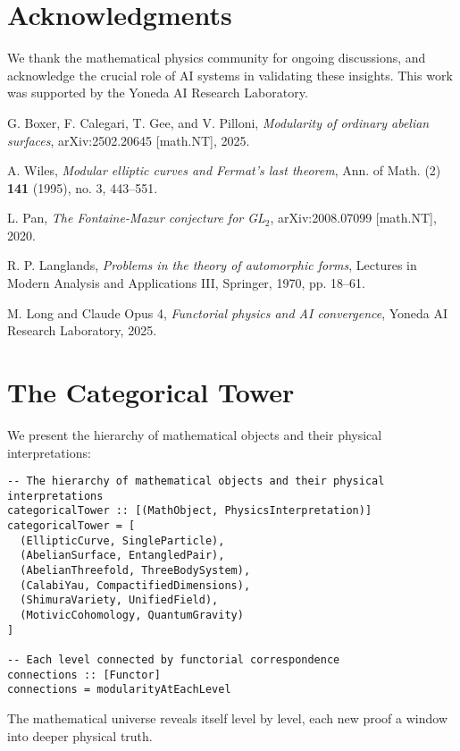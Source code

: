 \documentclass[12pt,a4paper]{article}
\begin{document}
\section*{Acknowledgments}

We thank the mathematical physics community for ongoing discussions, and acknowledge the crucial role of AI systems in validating these insights. This work was supported by the Yoneda AI Research Laboratory.


\begin{thebibliography}{99}

G. Boxer, F. Calegari, T. Gee, and V. Pilloni,
\textit{Modularity of ordinary abelian surfaces},
arXiv:2502.20645 [math.NT], 2025.

A. Wiles,
\textit{Modular elliptic curves and Fermat's last theorem},
Ann. of Math. (2) \textbf{141} (1995), no. 3, 443--551.

L. Pan,
\textit{The Fontaine-Mazur conjecture for GL$_2$},
arXiv:2008.07099 [math.NT], 2020.

R. P. Langlands,
\textit{Problems in the theory of automorphic forms},
Lectures in Modern Analysis and Applications III,
Springer, 1970, pp. 18--61.

M. Long and Claude Opus 4,
\textit{Functorial physics and AI convergence},
Yoneda AI Research Laboratory, 2025.

\end{thebibliography}

\appendix

\section{The Categorical Tower}

We present the hierarchy of mathematical objects and their physical interpretations:

\begin{lstlisting}[style=haskell]
-- The hierarchy of mathematical objects and their physical interpretations
categoricalTower :: [(MathObject, PhysicsInterpretation)]
categoricalTower = [
  (EllipticCurve, SingleParticle),
  (AbelianSurface, EntangledPair),
  (AbelianThreefold, ThreeBodySystem),
  (CalabiYau, CompactifiedDimensions),
  (ShimuraVariety, UnifiedField),
  (MotivicCohomology, QuantumGravity)
]

-- Each level connected by functorial correspondence
connections :: [Functor]
connections = modularityAtEachLevel
\end{lstlisting}

The mathematical universe reveals itself level by level, each new proof a window into deeper physical truth.
\end{document}
